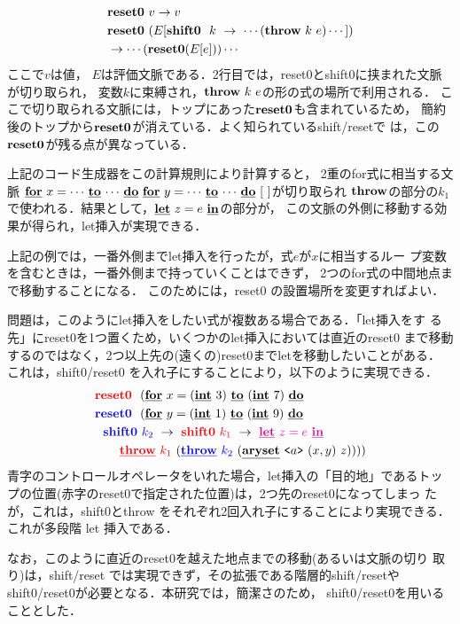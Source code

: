 
\begin{align*}
& \Resetz ~v \to v \\
& \Resetz ~(E[\Shiftz~~k~\to~\cdots(\Throw~k~e)\cdots]) \\
& \to \cdots(\Resetz(E[e]))\cdots
\end{align*}
ここで$v$は値，
$E$は評価文脈である．2行目では，reset0とshift0に挟まれた文脈が切り取られ，
変数$k$に束縛され，$\Throw~k~e$の形の式の場所で利用される．
ここで切り取られる文脈には，トップにあった$\Resetz$も含まれているため，
簡約後のトップから$\Resetz$が消えている．よく知られているshift/resetで
は，この$\Resetz$が残る点が異なっている．

上記のコード生成器をこの計算規則により計算すると，
2重のfor式に相当する文脈
$\cforin{x=\cdots}{\cdots}~\cforin{y=\cdots}{\cdots}~[~]$が切り取られ
$\Throw$の部分の$k_1$で使われる．結果として，$\cLet~z=e~\cIn$の部分が，
この文脈の外側に移動する効果が得られ，let挿入が実現できる．

上記の例では，一番外側までlet挿入を行ったが，式$e$が$x$に相当するルー
プ変数を含むときは，一番外側まで持っていくことはできず，
2つのfor式の中間地点まで移動することになる．
このためには，reset0 の設置場所を変更すればよい．

問題は，このようにlet挿入をしたい式が複数ある場合である．「let挿入をす
る先」にreset0を1つ置くため，いくつかのlet挿入においては直近のreset0
まで移動するのではなく，2つ以上先の(遠くの)reset0までletを移動したいことがある．
これは，shift0/reset0 を入れ子にすることにより，以下のように実現できる．
\begin{align*}
&\red{\Resetz} ~~(\cforin{x=(\cint~3)}{(\cint~7)} \\
&\blue{\Resetz} ~~(\cforin{y=(\cint~1)}{(\cint~9)} \\
&~~\blue{\Shiftz}~\blue{k_2}~\to~ \red{\Shiftz}~\red{k_1}~\to~ \magenta{\cLet~z=e~\cIn} \\
&~~~~~~
  \red{\cThrow}~\red{k_1}~(\blue{\cThrow}~\blue{k_2}~(\caryset{\code{a}}{(x,y)}{z}))))
\end{align*}
青字のコントロールオペレータをいれた場合，let挿入の「目的地」であるトッ
プの位置(赤字のreset0で指定された位置)は，2つ先のreset0になってしまっ
たが，これは，shift0とthrow をそれぞれ2回入れ子にすることにより実現できる．
これが多段階 let 挿入である．

なお，このように直近のreset0を越えた地点までの移動(あるいは文脈の切り
取り)は，shift/reset では実現できず，その拡張である階層的shift/resetや
shift0/reset0が必要となる．本研究では，簡潔さのため，
shift0/reset0を用いることとした．

